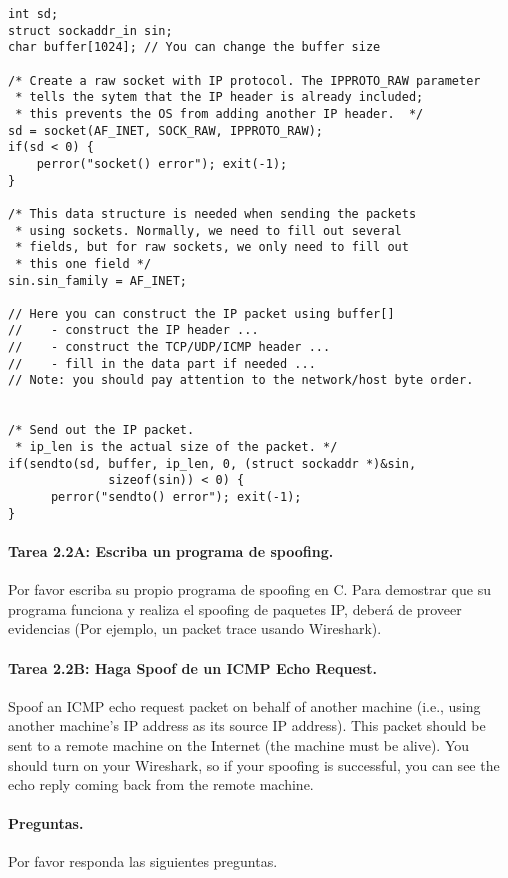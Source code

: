 \begin{lstlisting}
int sd;
struct sockaddr_in sin;
char buffer[1024]; // You can change the buffer size

/* Create a raw socket with IP protocol. The IPPROTO_RAW parameter
 * tells the sytem that the IP header is already included;
 * this prevents the OS from adding another IP header.  */
sd = socket(AF_INET, SOCK_RAW, IPPROTO_RAW);
if(sd < 0) {
    perror("socket() error"); exit(-1);
}

/* This data structure is needed when sending the packets 
 * using sockets. Normally, we need to fill out several 
 * fields, but for raw sockets, we only need to fill out
 * this one field */
sin.sin_family = AF_INET;

// Here you can construct the IP packet using buffer[]  
//    - construct the IP header ...
//    - construct the TCP/UDP/ICMP header ...
//    - fill in the data part if needed ...
// Note: you should pay attention to the network/host byte order.


/* Send out the IP packet. 
 * ip_len is the actual size of the packet. */  
if(sendto(sd, buffer, ip_len, 0, (struct sockaddr *)&sin, 
              sizeof(sin)) < 0) {
      perror("sendto() error"); exit(-1);
}
\end{lstlisting}



\paragraph{Tarea 2.2A: Escriba un programa de spoofing.}
Por favor escriba su propio programa de spoofing en C. Para demostrar que su programa funciona y realiza el spoofing de paquetes IP, deberá de proveer evidencias (Por ejemplo, un packet trace usando Wireshark).


\paragraph{Tarea 2.2B: Haga Spoof de un ICMP Echo Request.}

Spoof an ICMP echo request packet on behalf of another machine (i.e., 
using another machine's IP address as its source IP address). This packet 
should be sent to a remote machine on the Internet (the machine must be
alive). You should turn on your Wireshark, so if your spoofing is successful, 
you can see the echo reply coming back from the remote machine. 



\paragraph{Preguntas.} Por favor responda las siguientes preguntas.

